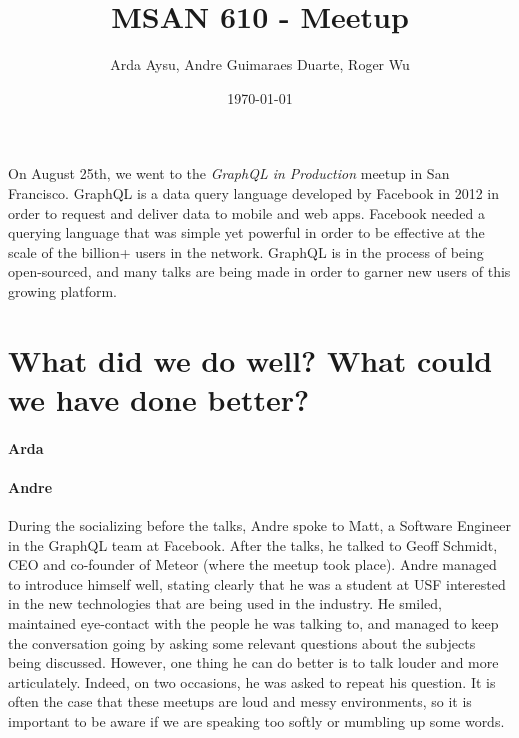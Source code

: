 \documentclass[]{article}
\title{MSAN 610 - Meetup}
\author{Arda Aysu, Andre Guimaraes Duarte, Roger Wu}
\date{\today}
\let\oldparagraph\paragraph
\renewcommand{\paragraph}[1]{\oldparagraph{#1}\mbox{}}
\begin{document}
\maketitle

\doublespacing


On August 25th, we went to the \textit{GraphQL in Production} meetup in San Francisco. GraphQL is a data query language developed by Facebook in 2012 in order to request and deliver data to mobile and web apps. Facebook needed a querying language that was simple yet powerful in order to be effective at the scale of the billion+ users in the network. GraphQL is in the process of being open-sourced, and many talks are being made in order to garner new users of this growing platform.

\section*{What did we do well? What could we have done better?}
\paragraph{Arda}





\paragraph{Andre}
During the socializing before the talks, Andre spoke to Matt, a Software Engineer in the GraphQL team at Facebook. After the talks, he talked to Geoff Schmidt, CEO and co-founder of Meteor (where the meetup took place). Andre managed to introduce himself well, stating clearly that he was a student at USF interested in the new technologies that are being used in the industry. He smiled, maintained eye-contact with the people he was talking to, and managed to keep the conversation going by asking some relevant questions about the subjects being discussed. However, one thing he can do better is to talk louder and more articulately. Indeed, on two occasions, he was asked to repeat his question. It is often the case that these meetups are loud and messy environments, so it is important to be aware if we are speaking too softly or mumbling up some words.
\end{document}
